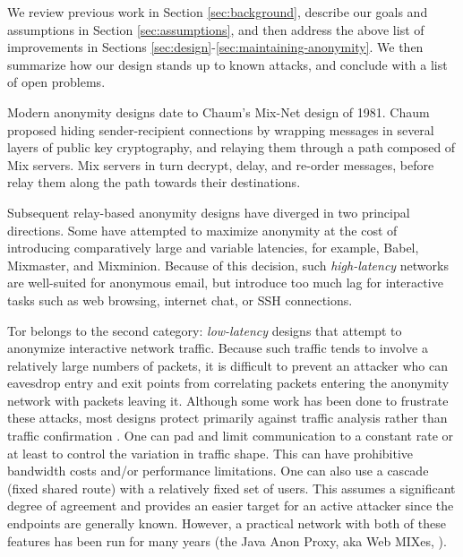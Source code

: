 \documentclass[times,10pt,twocolumn]{article}
\begin{document}
We review previous work in Section \ref{sec:background}, describe
our goals and assumptions in Section \ref{sec:assumptions},
and then address the above list of improvements in Sections
\ref{sec:design}-\ref{sec:maintaining-anonymity}. We then summarize
how our design stands up to known attacks, and conclude with a list of
open problems.


\label{sec:background}

\label{sec:related-work}
Modern anonymity designs date to Chaum's Mix-Net\cite{chaum-mix} design of
1981.  Chaum proposed hiding sender-recipient connections by wrapping
messages in several layers of public key cryptography, and relaying them
through a path composed of Mix servers.  Mix servers in turn decrypt, delay,
and re-order messages, before relay them along the path towards their
destinations.

Subsequent relay-based anonymity designs have diverged in two
principal directions.  Some have attempted to maximize anonymity at
the cost of introducing comparatively large and variable latencies,
for example, Babel\cite{babel}, Mixmaster\cite{mixmaster-spec}, and
Mixminion\cite{minion-design}.  Because of this
decision, such \emph{high-latency} networks are well-suited for anonymous
email, but introduce too much lag for interactive tasks such as web browsing,
internet chat, or SSH connections.

Tor belongs to the second category: \emph{low-latency} designs that
attempt to anonymize interactive network traffic.  Because such
traffic tends to involve a relatively large numbers of packets, it is
difficult to prevent an attacker who can eavesdrop entry and exit
points from correlating packets entering the anonymity network with
packets leaving it. Although some work has been done to frustrate
these attacks, most designs protect primarily against traffic analysis
rather than traffic confirmation \cite{or-jsac98}.  One can pad and
limit communication to a constant rate or at least to control the
variation in traffic shape. This can have prohibitive bandwidth costs
and/or performance limitations. One can also use a cascade (fixed
shared route) with a relatively fixed set of users. This assumes a
significant degree of agreement and provides an easier target for an active
attacker since the endpoints are generally known. However, a practical
network with both of these features has been run for many years
(the Java Anon Proxy, aka Web MIXes, \cite{web-mix}).
\end{document}
